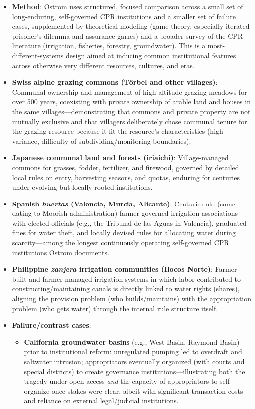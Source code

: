 \documentclass[12pt]{article}
\begin{document}
\begin{itemize}[leftmargin=*, itemsep=4pt]
    \item \textbf{Method}: Ostrom uses structured, focused comparison across a small set of long-enduring, self-governed CPR institutions and a smaller set of failure cases, supplemented by theoretical modeling (game theory, especially iterated prisoner's dilemma and assurance games) and a broader survey of the CPR literature (irrigation, fisheries, forestry, groundwater). This is a most-different-systems design aimed at inducing common institutional features across otherwise very different resources, cultures, and eras.
    \item \textbf{Swiss alpine grazing commons (Törbel and other villages)}: Communal ownership and management of high-altitude grazing meadows for over 500 years, coexisting with private ownership of arable land and houses in the same villages---demonstrating that commons and private property are not mutually exclusive and that villagers deliberately chose communal tenure for the grazing resource because it fit the resource's characteristics (high variance, difficulty of subdividing/monitoring boundaries).
    \item \textbf{Japanese communal land and forests (iriaichi)}: Village-managed commons for grasses, fodder, fertilizer, and firewood, governed by detailed local rules on entry, harvesting seasons, and quotas, enduring for centuries under evolving but locally rooted institutions.
    \item \textbf{Spanish \emph{huertas} (Valencia, Murcia, Alicante)}: Centuries-old (some dating to Moorish administration) farmer-governed irrigation associations with elected officials (e.g., the Tribunal de las Aguas in Valencia), graduated fines for water theft, and locally devised rules for allocating water during scarcity---among the longest continuously operating self-governed CPR institutions Ostrom documents.
    \item \textbf{Philippine \emph{zanjera} irrigation communities (Ilocos Norte)}: Farmer-built and farmer-managed irrigation systems in which labor contributed to constructing/maintaining canals is directly linked to water rights (shares), aligning the provision problem (who builds/maintains) with the appropriation problem (who gets water) through the internal rule structure itself.
    \item \textbf{Failure/contrast cases}:
    \begin{itemize}
        \item \textbf{California groundwater basins} (e.g., West Basin, Raymond Basin) prior to institutional reform: unregulated pumping led to overdraft and saltwater intrusion; appropriators eventually organized (with courts and special districts) to create governance institutions---illustrating both the tragedy under open access \emph{and} the capacity of appropriators to self-organize once stakes were clear, albeit with significant transaction costs and reliance on external legal/judicial institutions.

\end{itemize}
\end{itemize}
\end{document}
